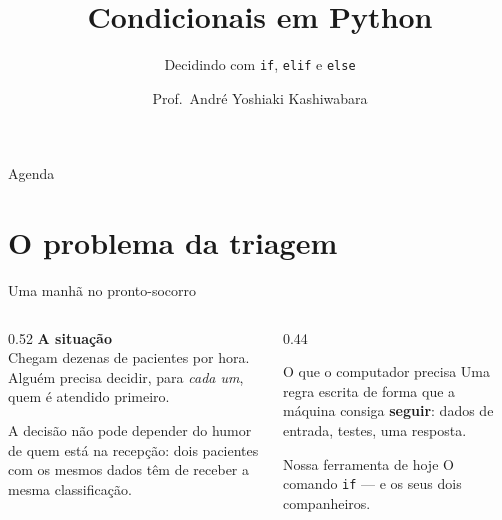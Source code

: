 \documentclass[aspectratio=169]{beamer}
\title{Condicionais em Python}
\subtitle{Decidindo com \texttt{if}, \texttt{elif} e \texttt{else}}
\author{Prof.\ André Yoshiaki Kashiwabara}
\institute{DCOMP -- Universidade Federal de Sergipe\\
\texttt{andreyoshiaki@dcomp.ufs.br}}
\date{}
\newcommand{\code}[1]{\texttt{\small #1}}
\begin{document}

\begin{frame}[plain]
  \titlepage
\end{frame}

\begin{frame}{Agenda}
  \tableofcontents
\end{frame}

\section{O problema da triagem}

\begin{frame}{Uma manhã no pronto-socorro}
  \begin{columns}[T]
    \begin{column}{0.52\textwidth}
      \textbf{A situação}\\[0.2cm]
      Chegam dezenas de pacientes por hora. Alguém precisa decidir,
      para \emph{cada um}, quem é atendido primeiro.

      \vspace{0.3cm}
      A decisão não pode depender do humor de quem está na recepção:
      dois pacientes com os mesmos dados têm de receber a mesma
      classificação.
    \end{column}
    \begin{column}{0.44\textwidth}
      \begin{block}{O que o computador precisa}
        Uma regra escrita de forma que a máquina consiga
        \textbf{seguir}: dados de entrada, testes, uma resposta.
      \end{block}
      \begin{exampleblock}{Nossa ferramenta de hoje}
        O comando \code{if} --- e os seus dois companheiros.
      \end{exampleblock}
    \end{column}
  \end{columns}
\end{frame}
\end{document}
